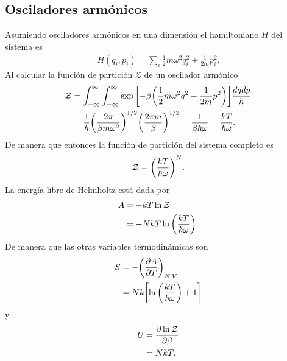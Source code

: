 \subsection{Osciladores armónicos}
Asumiendo osciladores armónicos en una dimensión el hamiltoniano
$H$ del sistema es 
\begin{align}
H(q_i,p_i)=\sum_i\frac{1}{2}m\omega^2q_i^2+\frac{1}{2m}p_i^2.
\end{align}
Al calcular la función de partición $\mathcal{Z}$ de un oscilador armónico
\begin{align}
\mathcal{Z}&=\int _{-\infty}^{\infty}\int _{-\infty}^{\infty}
\exp\qty[-\beta\qty(\frac{1}{2}m\omega^2q^2+\frac{1}{2m}p^2)]
\frac{dqdp}{h}\nonumber\\
&=\frac{1}{h}\qty(\frac{2\pi}{\beta m\omega^2})^{1/2}
\qty(\frac{2\pi m}{\beta})^{1/2}=
\frac{1}{\beta\hbar\omega}=\frac{kT}{\hbar\omega}.
\end{align}
De manera que entonces la función de partición del sistema 
completo es 
\begin{align}
\mathcal{Z}=\qty(\frac{kT}{\hbar\omega})^N.
\end{align}
La energía libre de Helmholtz está dada por 
\begin{align}
A&=-kT\ln \mathcal{Z}\nonumber\\
&=-NkT\ln\qty(\frac{kT}{\hbar\omega}).
\end{align}
De manera que las otras variables termodinámicas son
\begin{align}
S&=-\qty(\pdv{A}{T})_{N,V}\nonumber\\
&=Nk\qty[\ln\qty(\frac{kT}{\hbar\omega})+1]
\end{align}
y 
\begin{align}
U&=\pdv{\ln\mathcal{Z}}{\beta}\nonumber\\
&=NkT.
\end{align}